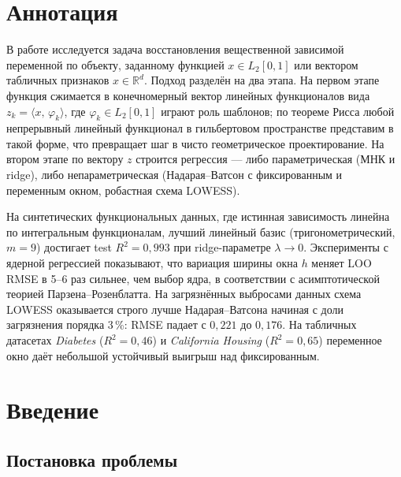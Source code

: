 \documentclass[12pt,a4paper]{article}
\theoremstyle{definition}
\theoremstyle{remark}
\newcommand{\R}{\mathbb{R}}
\newcommand{\Ltwo}{L_{2}[0,1]}
\newcommand{\inner}[2]{\langle #1,\,#2\rangle}
\begin{document}
\tableofcontents
\newpage

\section*{Аннотация}

В работе исследуется задача восстановления вещественной зависимой переменной
по объекту, заданному функцией $x\in\Ltwo$ или вектором табличных признаков
$x\in\R^{d}$. Подход разделён на два этапа. На первом этапе функция
сжимается в конечномерный вектор линейных функционалов вида
$z_{k}=\inner{x}{\varphi_{k}}$, где $\varphi_{k}\in\Ltwo$ играют роль
шаблонов; по теореме Рисса любой непрерывный линейный функционал в гильбертовом
пространстве представим в такой форме, что превращает шаг в чисто геометрическое
проектирование. На втором этапе по вектору $z$ строится регрессия --- либо
параметрическая (МНК и ridge), либо непараметрическая (Надарая--Ватсон с
фиксированным и переменным окном, робастная схема LOWESS).

На синтетических функциональных данных, где истинная зависимость линейна по
интегральным функционалам, лучший линейный базис (тригонометрический,
$m=9$) достигает test $R^{2}=0{,}993$ при ridge-параметре $\lambda\to 0$.
Эксперименты с ядерной регрессией показывают, что вариация ширины окна $h$
меняет LOO RMSE в 5--6 раз сильнее, чем выбор ядра, в соответствии с
асимптотической теорией Парзена--Розенблатта. На загрязнённых выбросами
данных схема LOWESS оказывается строго лучше Надарая--Ватсона начиная с
доли загрязнения порядка 3\,\%: RMSE падает с $0{,}221$ до $0{,}176$. На
табличных датасетах \textit{Diabetes} ($R^{2}=0{,}46$) и
\textit{California Housing} ($R^{2}=0{,}65$) переменное окно даёт небольшой
устойчивый выигрыш над фиксированным.

\newpage

\section{Введение}

\subsection{Постановка проблемы}
\end{document}
